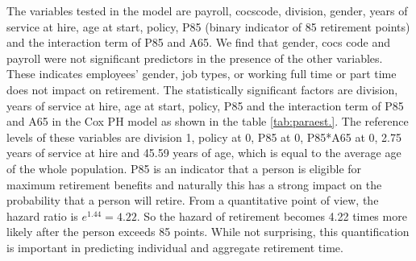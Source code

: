 \documentclass[12pt,letterpaper]{article}
\begin{document}
\begin{enumerate}
The variables tested in the model are payroll, cocscode, division, gender, years of service at hire, age at start, policy, P85 (binary indicator of 85 retirement points) and the interaction term of P85 and A65. We find that gender, cocs code and payroll were not significant predictors in the presence of the other variables. These indicates employees' gender, job types, or working full time or part time does not impact on retirement.
The statistically significant factors are division, years of service at hire, age at start, policy, P85 and the interaction term of P85 and A65 in the Cox PH model as shown in the table \ref{tab:paraest.}. The reference levels of these variables are division 1, policy at 0, P85 at 0, P85*A65 at 0, 2.75 years of service at hire and 45.59 years of age, which is equal to the average age of the whole population. P85 is an indicator that a person is eligible for maximum retirement benefits and naturally this has a strong impact on the probability that a person will retire.  From a quantitative point of view, the hazard ratio is $e^{1.44} = 4.22$.  So the hazard of retirement becomes 4.22 times more likely after the person exceeds 85 points.  While not surprising, this quantification is important in predicting individual and aggregate retirement time.

\end{enumerate}
\end{document}
